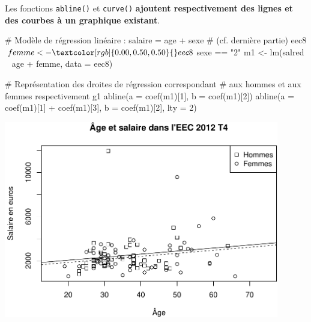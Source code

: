 \documentclass[12pt,twosided, notitlepage]{book}
\newenvironment{Shaded}{}{}
\newcommand{\KeywordTok}[1]{\textcolor[rgb]{0.00,0.00,1.00}{#1}}
\newcommand{\DataTypeTok}[1]{#1}
\newcommand{\DecValTok}[1]{#1}
\newcommand{\StringTok}[1]{\textcolor[rgb]{0.00,0.50,0.50}{#1}}
\newcommand{\CommentTok}[1]{\textcolor[rgb]{0.00,0.50,0.00}{#1}}
\newcommand{\OperatorTok}[1]{#1}
\newcommand{\NormalTok}[1]{#1}
\renewenvironment{Shaded}{\begin{snugshade}}{\end{snugshade}}
\begin{document}
Les fonctions \texttt{abline()} et
\texttt{curve()} \textbf{ajoutent
respectivement des lignes et des courbes à un graphique existant}.

\begin{Shaded}
\begin{Highlighting}[]
\CommentTok{# Modèle de régression linéaire : salaire = age + sexe}
\CommentTok{# (cf. dernière partie)}
\NormalTok{eec8}\OperatorTok{$}\NormalTok{femme <-}\StringTok{ }\NormalTok{eec8}\OperatorTok{$}\NormalTok{sexe }\OperatorTok{==}\StringTok{ "2"}
\NormalTok{m1 <-}\StringTok{ }\KeywordTok{lm}\NormalTok{(salred }\OperatorTok{~}\StringTok{ }\NormalTok{age }\OperatorTok{+}\StringTok{ }\NormalTok{femme, }\DataTypeTok{data =}\NormalTok{ eec8)}

\CommentTok{# Représentation des droites de régression correspondant}
\CommentTok{# aux hommes et aux femmes respectivement}
\NormalTok{g1}
\KeywordTok{abline}\NormalTok{(}\DataTypeTok{a =} \KeywordTok{coef}\NormalTok{(m1)[}\DecValTok{1}\NormalTok{], }\DataTypeTok{b =} \KeywordTok{coef}\NormalTok{(m1)[}\DecValTok{2}\NormalTok{])}
\KeywordTok{abline}\NormalTok{(}\DataTypeTok{a =} \KeywordTok{coef}\NormalTok{(m1)[}\DecValTok{1}\NormalTok{] }\OperatorTok{+}\StringTok{ }\KeywordTok{coef}\NormalTok{(m1)[}\DecValTok{3}\NormalTok{], }\DataTypeTok{b =} \KeywordTok{coef}\NormalTok{(m1)[}\DecValTok{2}\NormalTok{], }\DataTypeTok{lty =} \DecValTok{2}\NormalTok{)}
\end{Highlighting}
\end{Shaded}

\begin{center}\includegraphics[width=12cm]{livret_files/figure-latex/unnamed-chunk-439-1} \end{center}
\end{document}

